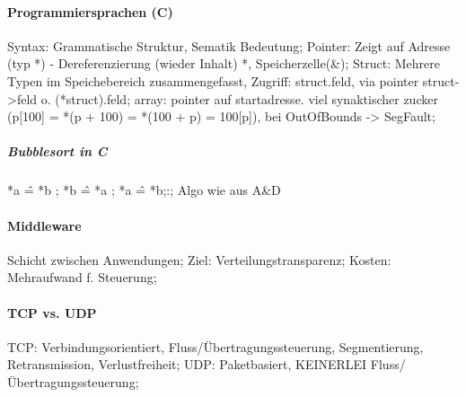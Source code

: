 \documentclass[pagesize,11pt,a4paper]{scrartcl}
\begin{document}
\paragraph*{Programmiersprachen (C)}
	Syntax: Grammatische Struktur, Sematik Bedeutung;
	Pointer: Zeigt auf Adresse (typ *) - Dereferenzierung (wieder Inhalt) *, Speicherzelle(\&);
	Struct: Mehrere Typen im Speichebereich zusammengefasst, Zugriff: struct.feld, via pointer struct->feld o. (*struct).feld;
	array: pointer auf startadresse. viel synaktischer zucker (p[100] = *(p + 100) = *(100 + p) = 100[p]), bei OutOfBounds -> SegFault;

\subparagraph*{Bubblesort in C}
	*a \^= *b ; *b \^= *a ; *a \^= *b;:;
	Algo wie aus A\&D

\paragraph*{Middleware}
	Schicht zwischen Anwendungen;
	Ziel: Verteilungstransparenz;
	Kosten: Mehraufwand f. Steuerung;

\paragraph*{TCP vs. UDP}
	TCP: Verbindungsorientiert, Fluss/Übertragungssteuerung, Segmentierung, Retransmission, Verlustfreiheit;
	UDP: Paketbasiert, KEINERLEI Fluss/Übertragungssteuerung;
	
\end{document}

